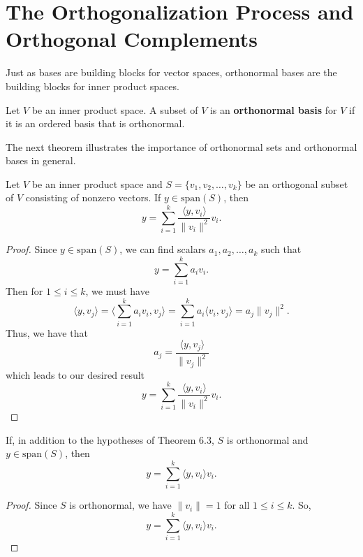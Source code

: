 \section{The Orthogonalization Process and Orthogonal Complements}

Just as bases are building blocks for vector spaces, orthonormal bases are the building blocks for inner product spaces.

\begin{definition}
   Let \( V  \) be an inner product space. A subset of \( V  \) is an \textbf{orthonormal basis} for \( V  \) if it is an ordered basis that is orthonormal. 
\end{definition}

The next theorem illustrates the importance of orthonormal sets and orthonormal bases in general.

\begin{theorem}\label{Theorem 6.3}
    Let \( V  \) be an inner product space and \( S = \{ {v}_{1}, {v}_{2}, \dots, {v}_{k } \}  \) be an orthogonal subset of \( V  \) consisting of nonzero vectors. If \( y \in \text{span}(S) \), then
    \[  y = \sum_{ i=1  }^{ k  } \frac{ \langle y , {v}_{i} \rangle }{ \|{v}_{i}\|^{2}  }  {v}_{i}. \]
\end{theorem}
\begin{proof}
Since \( y \in \text{span}(S) \), we can find scalars \( {a}_{1}, {a}_{2}, \dots, {a}_{k } \) such that
\[  y = \sum_{ i=1  }^{ k  }{a}_{i} {v}_{i}. \]
Then for \( 1 \leq i \leq k  \), we must have
\[  \langle y , {v}_{j} \rangle = \Big\langle \sum_{ i=1  }^{ k  } {a}_{i} {v}_{i} , {v}_{j} \Big\rangle  =\sum_{ i=1  }^{ k  } {a}_{i} \langle {v}_{i} , {v}_{j} \rangle = {a}_{j} \|{v}_{j}\|^{2}. \]
Thus, we have that
\[ {a}_{j} = \frac{ \langle y , {v}_{j} \rangle }{ \|{v}_{j}\|^{2} }  \]
which leads to our desired result 
\[  y = \sum_{ i=1  }^{ k  } \frac{ \langle y ,  {v}_{i} \rangle }{ \|{v}_{i}\|^{2} } {v}_{i}. \]
\end{proof}


\begin{corollary}\label{Corollary 1 to Theorem 6.3}
   If, in addition to the hypotheses of Theorem 6.3, \( S  \) is orthonormal and \( y \in \text{span}(S) \), then 
   \[  y = \sum_{ i=1  }^{ k  } \langle y , {v}_{i} \rangle {v}_{i}. \]
\end{corollary}

\begin{proof}
Since \( S  \) is orthonormal, we have \( \|{v}_{i}\| = 1  \) for all \( 1 \leq i \leq k  \). So,
\[  y = \sum_{ i=1  }^{ k  } \langle y , {v}_{i} \rangle {v}_{i}. \]
\end{proof}

